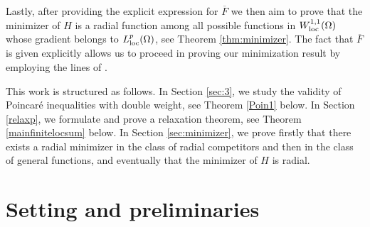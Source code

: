 \documentclass[11pt,leqno]{amsart}
\theoremstyle{remark}
\theoremstyle{definition}
\theoremstyle{definition}
\begin{document}
Lastly, after providing the explicit expression for $\overline{F}$ we then aim to prove that the minimizer of $H$ is a radial function among all possible functions in $W_{{\rm loc}}^{1,1}(\Omega)$ whose gradient belongs to $L_{{\rm loc}}^{p}(\Omega)$, see Theorem \autoref{thm:minimizer}.  The fact that $\overline{F}$ is given explicitly allows us to proceed in proving our minimization result by employing the lines of \cite{CrastaMalusa}.

This work is structured as follows. In Section \ref{sec:3}, we study the validity of Poincar\'e inequalities with double weight, see Theorem \ref{Poin1} below. In Section \ref{relaxp}, we formulate and prove a relaxation theorem, see Theorem \ref{mainfinitelocsum} below. In Section \ref{sec:minimizer}, we prove firstly that there exists a radial minimizer in the class of radial competitors and then in the class of general functions, and eventually that the minimizer of $H$ is radial.

\section{Setting and preliminaries}\label{sec:2}
\end{document}
